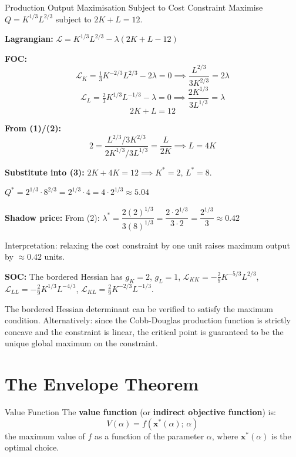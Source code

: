 \documentclass[12pt, a4paper]{article}
\theoremstyle{definition}
\newcommand{\bx}{\mathbf{x}}
\begin{document}
\begin{exbox}{Production Output Maximisation Subject to Cost Constraint}
Maximise $Q = K^{1/3}L^{2/3}$ subject to $2K + L = 12$.

\textbf{Lagrangian:}
$\mathcal{L} = K^{1/3}L^{2/3} - \lambda(2K+L-12)$

\textbf{FOC:}
\[
  \mathcal{L}_K = \tfrac{1}{3}K^{-2/3}L^{2/3} - 2\lambda = 0
  \implies \frac{L^{2/3}}{3K^{2/3}} = 2\lambda \tag{1}
\]
\[
  \mathcal{L}_L = \tfrac{2}{3}K^{1/3}L^{-1/3} - \lambda = 0
  \implies \frac{2K^{1/3}}{3L^{1/3}} = \lambda \tag{2}
\]
\[
  2K + L = 12 \tag{3}
\]

\textbf{From (1)/(2):}
\[
  2 = \frac{L^{2/3}/3K^{2/3}}{2K^{1/3}/3L^{1/3}} = \frac{L}{2K}
  \implies L = 4K
\]

\textbf{Substitute into (3):}
$2K + 4K = 12 \implies K^* = 2$, \quad $L^* = 8$.

$Q^* = 2^{1/3}\cdot 8^{2/3} = 2^{1/3}\cdot 4 = 4\cdot 2^{1/3} \approx 5.04$

\textbf{Shadow price:}
From (2): $\lambda^* = \dfrac{2(2)^{1/3}}{3(8)^{1/3}} = \dfrac{2\cdot2^{1/3}}{3\cdot 2} = \dfrac{2^{1/3}}{3} \approx 0.42$

Interpretation: relaxing the cost constraint by one unit raises maximum
output by $\approx 0.42$ units.

\textbf{SOC:} The bordered Hessian has
$g_K=2$, $g_L=1$, $\mathcal{L}_{KK} = -\tfrac{2}{9}K^{-5/3}L^{2/3}$,
$\mathcal{L}_{LL} = -\tfrac{2}{9}K^{1/3}L^{-4/3}$,
$\mathcal{L}_{KL} = \tfrac{2}{9}K^{-2/3}L^{-1/3}$.

The bordered Hessian determinant can be verified to satisfy the maximum
condition. Alternatively: since the Cobb-Douglas production function is
strictly concave and the constraint is linear, the critical point is
guaranteed to be the unique global maximum on the constraint.
\end{exbox}

\section{The Envelope Theorem}

\begin{defbox}{Value Function}
The \textbf{value function} (or \textbf{indirect objective function}) is:
\[
  V(\alpha) = f(\bx^*(\alpha);\, \alpha)
\]
the maximum value of $f$ as a function of the parameter $\alpha$, where
$\bx^*(\alpha)$ is the optimal choice.
\end{defbox}
\end{document}
